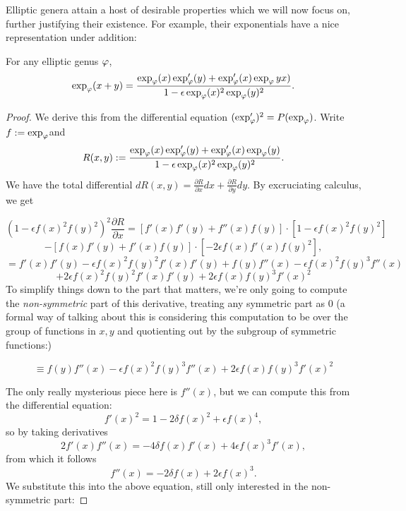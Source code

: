 Elliptic genera attain a host of desirable properties which we will now focus on, further justifying their existence. For example, their exponentials have a nice representation under addition:

\begin{proposition}
    For any elliptic genus $\varphi$,
    \[\exp_\varphi(x + y) = \frac{\exp_\varphi (x) \exp_\varphi' (y) + \exp_\varphi' (x) \exp_\varphi yx)    }{1 - \epsilon \exp_\varphi (x)^2 \exp_\varphi (y)^2  }.\]
\end{proposition}

\begin{proof}
    We derive this from the differential equation $(\exp_\varphi ')^2 = P(\exp_\varphi)$. Write $f:=\exp_\varphi $and
\[ R(x, y):= \frac{\exp_\varphi (x) \exp_\varphi' (y) + \exp_\varphi' (x) \exp_\varphi (y)    }{1 - \epsilon \exp_\varphi (x)^2 \exp_\varphi (y)^2  }.\]
We have the total differential $dR(x, y) = \frac{\partial R}{\partial x} dx + \frac{\partial R}{\partial y} dy$. By excruciating calculus, we get

\[(1 - \epsilon f(x)^2 f(y)^2)^2 \frac{\partial R}{\partial x} = [f'(x) f'(y) + f''(x) f(y)] \cdot [1 - \epsilon f(x)^2 f(y)^2]\]
\[ - [f(x) f'(y) + f'(x) f(y) ] \cdot [-2 \epsilon f(x) f'(x) f(y)^2],\]
\[ = f'(x) f'(y) - \epsilon f(x)^2 f(y)^2 f'(x) f'(y) + f(y)  f''(x) - \epsilon f(x)^2 f(y)^3 f''(x)\]
\[ + 2 \epsilon f(x)^2 f(y)^2 f'(x) f'(y) + 2 \epsilon f(x) f(y)^3 f'(x)^2 \]
To simplify things down to the part that matters, we're only going to compute the \textit{non-symmetric} part of this derivative, treating any symmetric part as $0$ (a formal way of talking about this is considering this computation to be over the group of functions in $x, y$ and quotienting out by the subgroup of symmetric functions:)

\[ \equiv f(y)  f''(x) - \epsilon f(x)^2 f(y)^3 f''(x)   + 2 \epsilon f(x) f(y)^3 f'(x)^2 \]


    The only really mysterious piece here is $f''(x)$, but we can compute this from the differential equation:
    \[f'(x)^2 = 1 -2 \delta f(x)^2 + \epsilon f(x)^4,\]
    so by taking derivatives
\[ 2 f'(x) f''(x) = -4 \delta f(x) f'(x) + 4 \epsilon f(x)^3 f'(x),\]
from which it follows
\[ f''(x) = -2 \delta f(x) + 2 \epsilon f(x)^3.\]
We substitute this into the above equation, still only interested in the non-symmetric part:


\end{proof}
